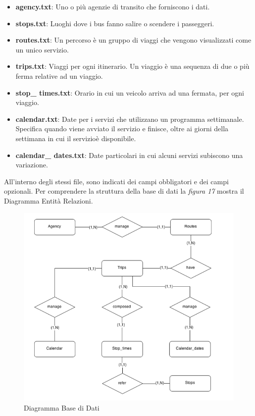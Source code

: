 \begin{itemize}
\item {\bf{agency.txt}}: Uno o pi\`{u} agenzie di transito che forniscono i dati.\\
\item {\bf{stops.txt}}: Luoghi dove i bus fanno salire o scendere i passeggeri.\\
\item {\bf{routes.txt}}: Un percorso è un gruppo di viaggi che vengono visualizzati come un unico servizio.\\
\item {\bf{trips.txt}}: Viaggi per ogni itinerario. Un viaggio è una sequenza di due o più ferma relative ad un viaggio.\\
\item {\bf{stop\_ times.txt}}: Orario in cui un veicolo arriva ad una fermata, per ogni viaggio.\\
\item {\bf{calendar.txt}}: Date per i servizi che utilizzano un programma settimanale. Specifica quando viene avviato il servizio e finisce, oltre ai giorni della settimana in cui il servizio\`{e} disponibile.\\
\item {\bf{calendar\_ dates.txt}}: Date particolari in cui alcuni servizi subiscono una variazione.\\
\end{itemize}
All\rq interno degli stessi file, sono indicati dei campi obbligatori e dei campi opzionali.
Per comprendere la struttura della base di dati la \emph{figura 17} mostra il Diagramma Entità Relazioni.



\begin{figure}[h]
\centering
\includegraphics[scale=.4]{img/ER.png}
\caption{Diagramma Base di Dati}
\label{fig:ER}
\end{figure}

